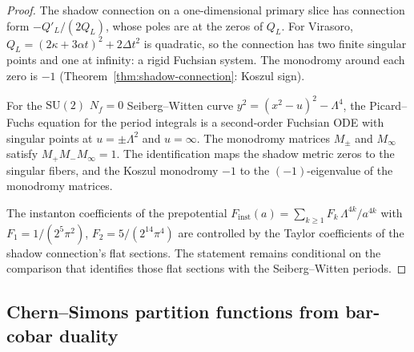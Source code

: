 \begin{proof}
The shadow connection on a one-dimensional primary slice
has connection form $-Q'_L/(2Q_L)$, whose poles are at the
zeros of $Q_L$. For Virasoro,
$Q_L = (2\kappa + 3\alpha t)^2 + 2\Delta t^2$
is quadratic, so the connection has two finite singular
points and one at infinity: a rigid Fuchsian system.
The monodromy around each zero is $-1$
(Theorem~\ref{thm:shadow-connection}: Koszul sign).

For the $\mathrm{SU}(2)$ $N_f = 0$ Seiberg--Witten curve
$y^2 = (x^2 - u)^2 - \Lambda^4$, the Picard--Fuchs equation
for the period integrals is a second-order Fuchsian ODE with
singular points at $u = \pm\Lambda^2$ and $u = \infty$. The
monodromy matrices $M_\pm$ and $M_\infty$ satisfy
$M_+ M_- M_\infty = 1$. The identification maps the shadow
metric zeros to the singular fibers, and the Koszul monodromy
$-1$ to the $(-1)$-eigenvalue of the monodromy matrices.

The instanton coefficients of the prepotential
$F_{\mathrm{inst}}(a)
= \sum_{k \ge 1} F_k\,\Lambda^{4k}/a^{4k}$
with $F_1 = 1/(2^5\pi^2)$, $F_2 = 5/(2^{14}\pi^4)$
are controlled by the Taylor coefficients of the
shadow connection's flat sections.  The statement remains conditional
on the comparison that identifies those flat sections with the
Seiberg--Witten periods.
\end{proof}

%
%

\subsection{Chern--Simons partition functions from bar-cobar duality}
\label{subsec:frontier-chern-simons}

